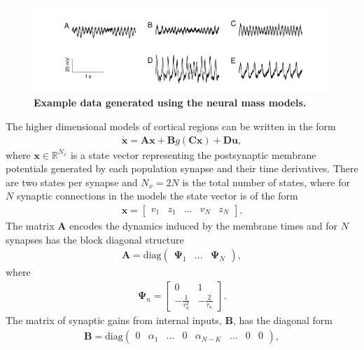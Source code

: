 \documentclass{article}
\begin{document}
\begin{figure}[ht]
	\centering
		\includegraphics[scale=1]{./figures/pdf/Example_Data.pdf}
		\caption{\textbf{Example data generated using the neural mass models.}}
	\label{fig:NMMs}
\end{figure}

The higher dimensional models of cortical regions can be written in the form
\begin{align}
	\dot{\mathbf{x}} = \mathbf{A}\mathbf{x} + \mathbf{B} g\left(\mathbf{C}\mathbf{x}\right) + \mathbf{D}\mathbf{u},
\end{align}
where $\mathbf{x} \in \mathbb{R}^{N_x}$ is a state vector representing the postsynaptic membrane potentials generated by each population synapse and their time derivatives. There are two states per synapse and $N_x = 2N$ is the total number of states, where for $N$ synaptic connections in the models the state vector is of the form
\begin{align}
	\mathbf{x} = \begin{bmatrix} v_{1} & z_{1} & \hdots & v_{N} & z_{N}  \end{bmatrix}.
\end{align}
The matrix $\mathbf{A}$ encodes the dynamics induced by the membrane times and for $N$ synapses has the block diagonal structure
\begin{align}
	\mathbf{A} = \mathrm{diag}\left(\begin{array}{ccc}\boldsymbol{\Psi}_1 & \hdots & \boldsymbol{\Psi}_N\end{array}\right),
\end{align}
where
\begin{align}
	\boldsymbol{\Psi}_n = \begin{bmatrix} 0 & 1 \\ -\frac{1}{\tau_n^2} & -\frac{2}{\tau_n} \end{bmatrix}.
\end{align}
The matrix of synaptic gains from internal inputs, $\mathbf{B}$, has the diagonal form 
\begin{align}
	\mathbf{B} = \mathrm{diag}\left(\begin{array}{cccccccc} 0 & \alpha_1 & \hdots & 0 & \alpha_{N-K} & \hdots & 0 & 0 \end{array}\right),
\end{align}
\end{document}
